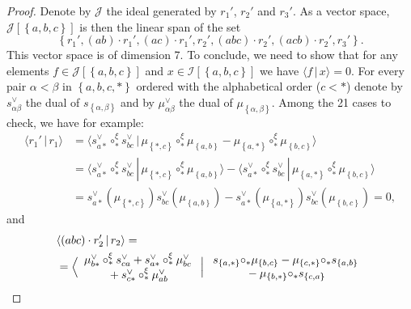 \documentclass[11pt]{article}
\theoremstyle{definition}
\numberwithin{equation}{section}
\newcommand{\set}[1]{\left\{#1\right\}}
\newcommand{\comp}[1][\ast]{\circ_{#1}}
\newcommand{\scalar}[2]{\langle #1 \,|\, #2\rangle}
\begin{document}
\begin{proof}
    Denote by $\mathcal{J}$ the ideal generated by $r_1'$, $r_2'$ and $r_3'$. As a vector space, 
    $\mathcal{J}[\set{a,b,c}]$ is then the linear span of the set
    \begin{equation}
        \set{ r_1', (ab) \cdot r_1', (ac) \cdot r_1',r_2', (abc)\cdot r_2', (acb)\cdot r_2', r_3'}.
    \end{equation}
    This vector space is of dimension 7. To conclude, we need to show that for any elements 
    $f\in\mathcal{J}[\set{a,b,c}]$ and $x\in\mathcal{I}[\set{a,b,c}]$ we have $\scalar{f}{x}=0$. For every 
    pair $\alpha < \beta$ in $\set{a,b,c,\ast}$ ordered with the alphabetical order ($c<\ast$) denote 
    by $s_{\alpha\beta}^{\vee}$ the dual of $s_{\set{\alpha,\beta}}$ and by $\mu_{\alpha\beta}^{\vee}$ the 
    dual of $\mu_{\set{\alpha,\beta}}$. Among the 21 cases to check, we have for example:
    \begin{equation}\begin{split}
        \scalar{ r_1'}{r_1 } &=
        \scalar{ s_{a\ast}^{\vee}\comp^{\xi} s_{bc}^{\vee}}{\mu_{\set{\ast,c}}\comp^{\xi}\mu_{\set{a,b}} -
        \mu_{\set{a,\ast}}\comp^{\xi} \mu_{\set{b,c}} } \\
        &= \scalar{ s_{a\ast}^{\vee}\comp^{\xi} s_{bc}^{\vee}}{ \mu_{\set{\ast,c}}\comp^{\xi}\mu_{\set{a,b}} } - \scalar{ s_{a\ast}^{\vee}\comp^{\xi} s_{bc}^{\vee}}{\mu_{\set{a,\ast}}\comp^{\xi} \mu_{\set{b,c}}} \\
        &= s_{a\ast}^{\vee}(\mu_{\set{\ast,c}})s_{bc}^{\vee}(\mu_{\set{a,b}}) -
        s_{a\ast}^{\vee}(\mu_{\set{a,\ast}})s_{bc}^{\vee}(\mu_{\set{b,c}}) = 0,
    \end{split}\end{equation}
    and
    \begin{align}
        &\scalar{ (abc)\cdot r_2'}{r_2}  = \\ \nonumber
        &= \Big\langle
        \begin{array}{c}%
            \mu_{b\ast}^{\vee}\comp^{\xi}s_{ca}^{\vee} + s_{a\ast}^{\vee}\comp^{\xi}\mu_{bc}^{\vee} \\
            {}+{} s_{c\ast}^{\vee}\comp^{\xi}\mu_{ab}^{\vee}
        \end{array}
        \Bigm|
        \begin{array}{c}%
            s_{\set{a,\ast}}{\comp} \mu_{\set{b,c}} - \mu_{\set{c,\ast}}{\comp} s_{\set{a,b}} \\
            {}-{} \mu_{\set{b,\ast}}{\comp} s_{\set{c,a}}
        \end{array}%

\end{align}
\end{proof}
\end{document}
